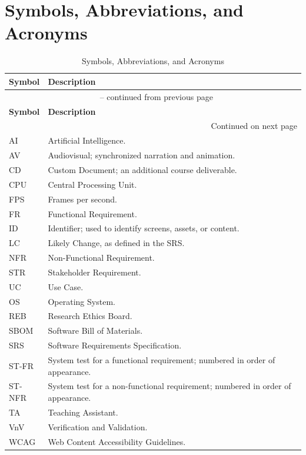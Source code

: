 \documentclass[10pt,titlepage]{article}
\begin{document}
\listoftables

\newpage

\section{Symbols, Abbreviations, and Acronyms}

\renewcommand{\arraystretch}{1.2}
\begin{longtable}{@{}p{}p{}@{}}
\caption{Symbols, Abbreviations, and Acronyms}\label{tab:VnVAcronyms}\\
\toprule
\textbf{Symbol} & \textbf{Description}\\
\midrule
\endfirsthead
\multicolumn{2}{c}{\tablename\ \thetable{} -- continued from previous page}\\
\toprule
\textbf{Symbol} & \textbf{Description}\\
\midrule
\endhead
\midrule
\multicolumn{2}{r}{Continued on next page}\\
\endfoot
\bottomrule
\endlastfoot
AI & Artificial Intelligence.\\
AV & Audiovisual; synchronized narration and animation.\\
CD & Custom Document; an additional course deliverable.\\
CPU & Central Processing Unit.\\
FPS & Frames per second.\\
FR & Functional Requirement.\\
ID & Identifier; used to identify screens, assets, or content.\\
LC & Likely Change, as defined in the SRS.\\
NFR & Non-Functional Requirement.\\
STR & Stakeholder Requirement. \\
UC & Use Case. \\
OS & Operating System.\\
REB & Research Ethics Board.\\
SBOM & Software Bill of Materials.\\
SRS & Software Requirements Specification.\\
ST-FR & System test for a functional requirement; numbered in order of appearance.\\
ST-NFR & System test for a non-functional requirement; numbered in order of appearance.\\
TA & Teaching Assistant.\\
VnV & Verification and Validation.\\
WCAG & Web Content Accessibility Guidelines. \\
\end{longtable}
\end{document}
